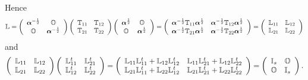 \documentclass[aps,preprint]{revtex4}%
\begin{document}
Hence%
\begin{equation}
\mathbb{L}=\left(
\begin{array}
[c]{cc}%
\boldsymbol{\alpha}^{-\frac{1}{2}} & \mathbb{O}\\
\mathbb{O} & \boldsymbol{\alpha}^{-\frac{1}{2}}%
\end{array}
\right)  \left(
\begin{array}
[c]{cc}%
\mathbb{T}_{11} & \mathbb{T}_{12}\\
\mathbb{T}_{21} & \mathbb{T}_{22}%
\end{array}
\right)  \left(
\begin{array}
[c]{cc}%
\boldsymbol{\alpha}^{\frac{1}{2}} & \mathbb{O}\\
\mathbb{O} & \boldsymbol{\alpha}^{\frac{1}{2}}%
\end{array}
\right)  =\left(
\begin{array}
[c]{cc}%
\boldsymbol{\alpha}^{-\frac{1}{2}}\mathbb{T}_{11}\boldsymbol{\alpha}^{\frac
{1}{2}} & \boldsymbol{\alpha}^{-\frac{1}{2}}\mathbb{T}_{12}\boldsymbol{\alpha
}^{\frac{1}{2}}\\
\boldsymbol{\alpha}^{-\frac{1}{2}}\mathbb{T}_{21}\boldsymbol{\alpha}^{\frac
{1}{2}} & \boldsymbol{\alpha}^{-\frac{1}{2}}\mathbb{T}_{22}\boldsymbol{\alpha
}^{\frac{1}{2}}%
\end{array}
\right)  =\left(
\begin{array}
[c]{cc}%
\mathbb{L}_{11} & \mathbb{L}_{12}\\
\mathbb{L}_{21} & \mathbb{L}_{22}%
\end{array}
\right)
\end{equation}
and%
\begin{equation}
\left(
\begin{array}
[c]{cc}%
\mathbb{L}_{11} & \mathbb{L}_{12}\\
\mathbb{L}_{21} & \mathbb{L}_{22}%
\end{array}
\right)  \left(
\begin{array}
[c]{cc}%
\mathbb{L}_{11}^{t} & \mathbb{L}_{21}^{t}\\
\mathbb{L}_{12}^{t} & \mathbb{L}_{22}^{t}%
\end{array}
\right)  =\left(
\begin{array}
[c]{cc}%
\mathbb{L}_{11}\mathbb{L}_{11}^{t}+\mathbb{L}_{12}\mathbb{L}_{12}^{t} &
\mathbb{L}_{11}\mathbb{L}_{21}^{t}+\mathbb{L}_{12}\mathbb{L}_{22}^{t}\\
\mathbb{L}_{21}\mathbb{L}_{11}^{t}+\mathbb{L}_{22}\mathbb{L}_{12}^{t} &
\mathbb{L}_{21}\mathbb{L}_{21}^{t}+\mathbb{L}_{22}\mathbb{L}_{22}^{t}%
\end{array}
\right)  =\left(
\begin{array}
[c]{cc}%
\mathbb{I}_{s} & \mathbb{O}\\
\mathbb{O} & \mathbb{I}_{s}%
\end{array}
\right)  .
\end{equation}
\end{document}
